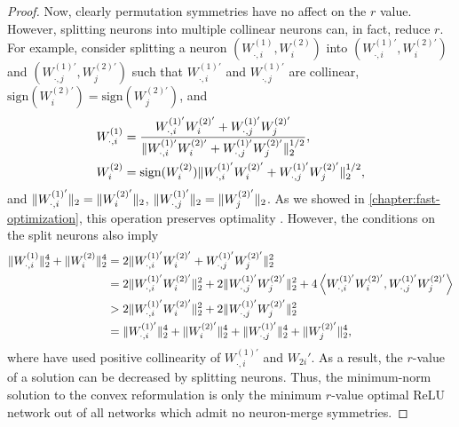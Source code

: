 \begin{proof}
    Now, clearly permutation symmetries have no affect on the \( r \) value.
    However, splitting neurons into multiple collinear neurons can, in fact,
    reduce \( r \).
    For example, consider splitting a neuron \( (W^{(1)}_{\cdot, i}, W^{(2)}_{i}) \) into
    \( (W^{(1)'}_{\cdot, i}, W^{(2)'}_{i}) \) and \( (W^{(1)'}_{\cdot, j}, W^{(2)'}_{j}) \) such that
    \( W^{(1)'}_{\cdot, i} \) and \( W^{(1)'}_{\cdot, j} \) are collinear, \( \text{sign}(W^{(2)'}_{i}) =
    \text{sign}(W^{(2)'}_{j}) \), and
    \[
        \begin{aligned}
            W^{(1)}_{\cdot, i}
             & = \frac{W^{(1)'}_{\cdot, i} W^{(2)'}_{i} + W^{(1)'}_{\cdot, j} W^{(2)'}_{j}}{\|W^{(1)'}_{\cdot, i} W^{(2)'}_{i} + W^{(1)'}_{\cdot, j} W^{(2)'}_{j}\|_2^{1/2}}, \\
            W^{(2)}_{i}
             & = \text{sign}(W^{(2)}_{i})\|W^{(1)'}_{\cdot, i} W^{(2)'}_{i} + W^{(1)'}_{\cdot, j} W^{(2)'}_{j}\|_2^{1/2},
        \end{aligned}
    \]
    and \( \|W^{(1)'}_{\cdot, i}\|_2 = \|W^{(2)'}_{i}\|_2 \),
    \( \|W^{(1)'}_{\cdot, j}\|_2 = \|W^{(2)'}_{j}\|_2 \).
    As we showed in \cref{chapter:fast-optimization}, this
    operation preserves optimality \citep{mishkin2022convex}.
    However, the conditions on the split neurons also imply
    \begin{align*}
        \|W^{(1)}_{\cdot, i}\|_2^4 + \|W^{(2)}_{i}\|_2^4
         & = 2 \|W^{(1)'}_{\cdot, i} W^{(2)'}_{i} + W^{(1)'}_{\cdot, j} W^{(2)'}_{j}\|_2^{2}                                   \\
         & = 2 \|W^{(1)'}_{\cdot, i} W^{(2)'}_{i}\|_2^2 + 2 \|W^{(1)'}_{\cdot, j} W^{(2)'}_{j}\|_2^2
        + 4 \left\langle W^{(1)'}_{\cdot, i} W^{(2)'}_{i}, W^{(1)'}_{\cdot, j} W^{(2)'}_{j}\right\rangle                                              \\
         & > 2 \|W^{(1)'}_{\cdot, i} W^{(2)'}_{i}\|_2^2 + 2 \|W^{(1)'}_{\cdot, j} W^{(2)'}_{j}\|_2^2                        \\
         & = \|W^{(1)'}_{\cdot, i}\|_2^4 + \|W^{(2)'}_{i}\|_2^4 + \|W^{(1)'}_{\cdot, j}\|_2^4 + \|W^{(2)'}_{j}\|_2^4,
    \end{align*}
    where have used positive collinearity of \( W^{(1)'}_{\cdot, i} \) and \( W_{2i}' \).
    As a result, the \( r \)-value of a solution can be decreased by splitting
    neurons.
    Thus, the minimum-norm solution to the convex reformulation is only the
    minimum \( r \)-value optimal ReLU network out of all
    networks which admit no neuron-merge symmetries.
\end{proof}

